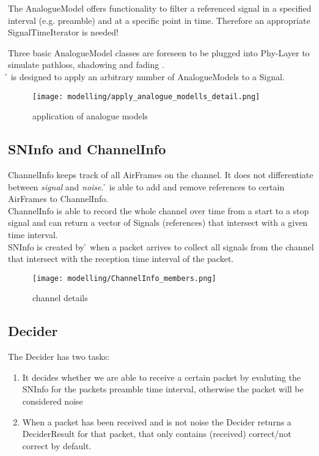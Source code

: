 The AnalogueModel offers functionality to filter a referenced signal in a specified interval (e.g. preamble) and at a specific point in time. Therefore an appropriate SignalTimeIterator is needed!

Three basic AnalogueModel classes are foreseen to be plugged into Phy-Layer to simulate
pathloss, shadowing and fading
.\\
\h{\bp} is designed to apply an arbitrary number of AnalogueModels to a Signal.

\begin{figure}[H]
 \centering
 \texttt{[image: modelling/apply\_analogue\_modells\_detail.png]}%
 \caption{application of analogue models}
 \label{fig: application analogue models}
\end{figure}




\subsection{SNInfo and ChannelInfo}

ChannelInfo keeps track of all AirFrames on the channel. It does not differentiate between \textit{signal} and \textit{noise}. \h{\bp} is able to
add and remove references to certain AirFrames to ChannelInfo.\\
ChannelInfo is able to record the whole channel over time from a start to a stop signal and can return a vector of Signals (references) that intersect with a given time interval.\\
SNInfo is created by \h{\bp} when a packet arrives to collect all signals from the channel that intersect with the reception time interval of the packet.

\begin{figure}[H]
 \centering
 \texttt{[image: modelling/ChannelInfo\_members.png]}
 \caption{channel details}
 \label{fig: channel details}
\end{figure}




\subsection{Decider}

The Decider has two tasks:
\begin{enumerate}
	\item It decides whether we are able to receive a certain packet by evaluting
	the SNInfo for the packets preamble time interval, otherwise the packet will 	be considered noise
	\item When a packet has been received and is not noise the Decider 	returns a DeciderResult for that packet, that only contains (received) correct/not correct 	by default.
\end{enumerate}

